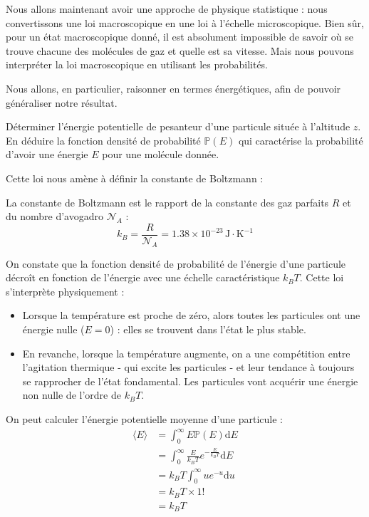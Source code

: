 \documentclass[11pt,fleqn]{book} %
\newcommand{\dd}{\mathrm{d}}
\begin{document}
Nous allons maintenant avoir une approche de physique statistique : nous convertissons une loi macroscopique en une loi à l'échelle microscopique. Bien sûr, pour un état macroscopique donné, il est absolument impossible de savoir où se trouve chacune des molécules de gaz et quelle est sa vitesse. Mais nous pouvons interpréter la loi macroscopique en utilisant les probabilités.

Nous allons, en particulier, raisonner en termes énergétiques, afin de pouvoir généraliser notre résultat.

\begin{capex}
	Déterminer l'énergie potentielle de pesanteur d'une particule située à l'altitude $z$. En déduire la fonction densité de probabilité $\mathbb{P}(E)$ qui caractérise la probabilité d'avoir une énergie $E$ pour une molécule donnée.
\end{capex}

Cette loi nous amène à définir la constante de Boltzmann :
\begin{definition}
	La constante de Boltzmann est le rapport de la constante des gaz parfaits $R$ et du nombre d'avogadro $\mathcal{N}_A$ :
	\begin{equation}
		k_B = \frac{R}{\mathcal{N}_A} = 1.38 \times 10^{-23}\,\mathrm{J}\cdot\mathrm{K}^{-1}
	\end{equation}
\end{definition}

On constate que la fonction densité de probabilité de l'énergie d'une particule décroît en fonction de l'énergie avec une échelle caractéristique $k_B T$. Cette loi s'interprète physiquement :
\begin{itemize}
	\item Lorsque la température est proche de zéro, alors toutes les particules ont une énergie nulle ($E = 0$) : elles se trouvent dans l'état le plus stable.
	\item En revanche, lorsque la température augmente, on a une compétition entre l'agitation thermique - qui excite les particules - et leur tendance à toujours se rapprocher de l'état fondamental. Les particules vont acquérir une énergie non nulle de l'ordre de $k_B T$.
\end{itemize}

On peut calculer l'énergie potentielle moyenne d'une particule :
\begin{align}
	\langle E \rangle &= \int_0^\infty E \mathbb{P}(E) \dd E \\
	&= \int_0^\infty \frac{E}{k_B T} e^{-\frac{E}{k_B T}}  \dd E \\
	&= k_B T \int_0^\infty u e^{-u} \dd u \\
	&= k_B T \times 1! \\
	&= k_B T
\end{align}
\end{document}
